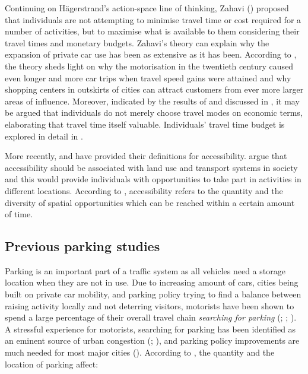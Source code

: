 Continuing on Hägerstrand's action-space line of thinking, Zahavi (\citeyear{Zahavi1974}) proposed that individuals are not attempting to minimise travel time or cost required for a number of activities, but to maximise what is available to them considering their travel times and monetary budgets. Zahavi's theory can explain why the expansion of private car use has been as extensive as it has been. According to , the theory sheds light on why the motorisation in the twentieth century caused even longer and more car trips when travel speed gains were attained and why shopping centers in outskirts of cities can attract customers from ever more larger areas of influence. Moreover, indicated by the results of  and discussed in , it may be argued that individuals do not merely choose travel modes on economic terms, elaborating that travel time itself valuable. Individuals' travel time budget is explored in detail in .

More recently,  and  have provided their definitions for accessibility. \citeauthor{Geurs2004} argue that accessibility should be associated with land use and transport systems in society and this would provide individuals with opportunities to take part in activities in different locations. According to \cite{Bertolini2003}, accessibility refers to the quantity and the diversity of spatial opportunities which can be reached within a certain amount of time.

\subsection{Previous parking studies}
\justify

Parking is an important part of a traffic system as all vehicles need a storage location when they are not in use. Due to increasing amount of cars, cities being built on private car mobility, and parking policy trying to find a balance between raising activity locally and not deterring visitors, motorists have been shown to spend a large percentage of their overall travel chain \textit{searching for parking} (\cite{Axhausen1991}; \cite{Marsden2006}; \cite{Shoup2006}). A stressful experience for motorists, searching for parking has been identified as an eminent source of urban congestion (\cite{Axhausen1993}; \cite{Gantelet2006}), and parking policy improvements are much needed for most major cities (\cite{Benenson2009a}). According to , the quantity and the location of parking affect:

